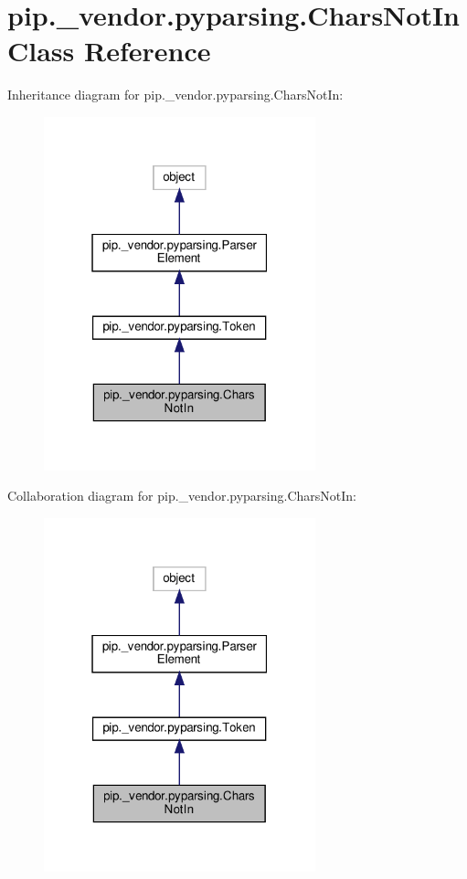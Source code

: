 \hypertarget{classpip_1_1__vendor_1_1pyparsing_1_1CharsNotIn}{}\section{pip.\+\_\+vendor.\+pyparsing.\+Chars\+Not\+In Class Reference}
\label{classpip_1_1__vendor_1_1pyparsing_1_1CharsNotIn}


Inheritance diagram for pip.\+\_\+vendor.\+pyparsing.\+Chars\+Not\+In\+:
\nopagebreak
\begin{figure}[H]
\begin{center}
\leavevmode
\includegraphics[width=223pt]{classpip_1_1__vendor_1_1pyparsing_1_1CharsNotIn__inherit__graph}
\end{center}
\end{figure}


Collaboration diagram for pip.\+\_\+vendor.\+pyparsing.\+Chars\+Not\+In\+:
\nopagebreak
\begin{figure}[H]
\begin{center}
\leavevmode
\includegraphics[width=223pt]{classpip_1_1__vendor_1_1pyparsing_1_1CharsNotIn__coll__graph}
\end{center}
\end{figure}
